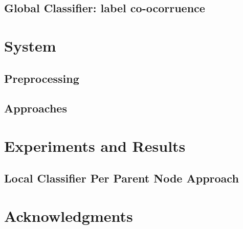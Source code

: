 \documentclass[11pt]{article}
\begin{document}
\subsection{Global Classifier: label co-ocorruence}



\section{System}

\subsection{Preprocessing}


\subsection{Approaches}


\section{Experiments and Results}

\subsection{Local Classifier Per Parent Node Approach}




\section*{Acknowledgments}




\end{document}
